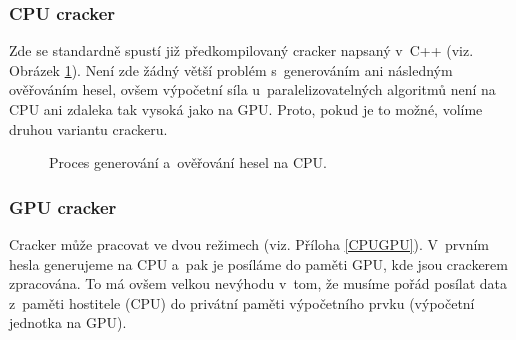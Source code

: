 \subsubsection{CPU cracker}
Zde se standardně spustí již předkompilovaný cracker napsaný v~C++ (viz. Obrázek \ref{CPU}). Není
zde žádný větší problém s~generováním ani následným ověřováním hesel, ovšem výpočetní síla
u~paralelizovatelných algoritmů není na CPU ani zdaleka tak vysoká jako na GPU. Proto, pokud je to
možné, volíme druhou variantu crackeru.
\begin{figure}[ht]
    \begin{center}
    \end{center}
    \caption{Proces generování a~ověřování hesel na CPU. \cite{Schmied}}
    \label{CPU}
\end{figure}

\subsubsection{GPU cracker}
Cracker může pracovat ve dvou režimech (viz. Příloha \ref{CPUGPU}). V~prvním hesla generujeme na
CPU a~pak je posíláme do paměti GPU, kde jsou crackerem zpracována. To má ovšem velkou nevýhodu
v~tom, že musíme pořád posílat data z~paměti hostitele (CPU) do privátní paměti výpočetního prvku
(výpočetní jednotka na GPU).

